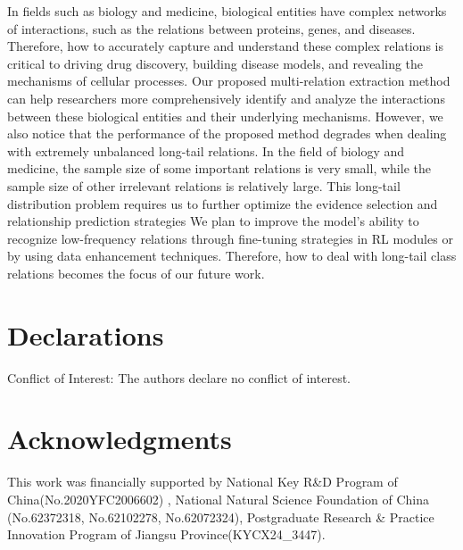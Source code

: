 \documentclass[preprint,12pt]{elsarticle}
\begin{document}
In fields such as biology and medicine, biological entities have complex networks of interactions, such as the relations between proteins, genes, and diseases. Therefore, how to accurately capture and understand these complex relations is critical to driving drug discovery, building disease models, and revealing the mechanisms of cellular processes. Our proposed multi-relation extraction method can help researchers more comprehensively identify and analyze the interactions between these biological entities and their underlying mechanisms. However, we also notice that the performance of the proposed method degrades when dealing with extremely unbalanced long-tail relations. In the field of biology and medicine, the sample size of some important relations is very small, while the sample size of other irrelevant relations is relatively large. This long-tail distribution problem requires us to further optimize the evidence selection and relationship prediction strategies We plan to improve the model's ability to recognize low-frequency relations through fine-tuning strategies in RL modules or by using data enhancement techniques. Therefore, how to deal with long-tail class relations becomes the focus of our future work. 

\section*{Declarations}

Conflict of Interest: The authors declare no conflict of interest.
\section*{Acknowledgments}
This work was financially supported by National Key R\&D Program of China(No.2020YFC2006602) , National Natural Science Foundation of China (No.62372318, No.62102278, No.62072324), Postgraduate Research \& Practice Innovation Program of Jiangsu Province(KYCX24\_3447).







\end{document}
